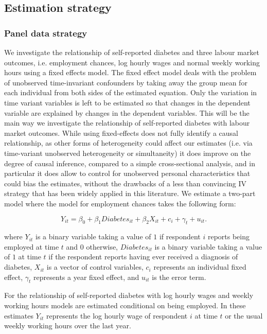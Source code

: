 \subsection{\label{sec:Estimation_Strategy}Estimation strategy}


\subsubsection{Panel data strategy}

We investigate the relationship of self-reported diabetes and three
labour market outcomes, i.e. employment chances, log hourly wages
and normal weekly working hours using a fixed effects model. The fixed
effect model deals with the problem of unobserved time-invariant confounders
by taking away the group mean for each individual from both sides
of the estimated equation. Only the variation in time variant variables
is left to be estimated so that changes in the dependent variable
are explained by changes in the dependent variables. This will be
the main way we investigate the relationship of self-reported diabetes
with labour market outcomes. While using fixed-effects does not fully
identify a causal relationship, as other forms of heterogeneity could
affect our estimates (i.e. via time-variant unobserved heterogeneity
or simultaneity) it does improve on the degree of causal inference,
compared to a simple cross-sectional analysis, and in particular it
does allow to control for unobserved personal characteristics that
could bias the estimates, without the drawbacks of a less than convincing
\ac{IV} strategy that has been widely applied in this literature.
We estimate a two-part model where the model for employment chances
takes the following form:

\noindent 
\begin{equation}
Y_{it}=\beta_{0}+\beta_{1}Diabetes_{it}+\beta_{2}X_{it}+c_{i}+\gamma_{t}+u_{it}.\label{eq:employed}
\end{equation}


where $Y_{it}$ is a binary variable taking a value of $1$ if respondent
$i$ reports being employed at time $t$ and $0$ otherwise, $Diabetes_{it}$
is a binary variable taking a value of $1$ at time $t$ if the respondent
reports having ever received a diagnosis of diabetes, $X_{it}$ is
a vector of control variables, $c_{i}$ represents an individual fixed
effect, $\gamma_{t}$ represents a year fixed effect, and $u_{it}$
is the error term.

For the relationship of self-reported diabetes with log hourly wages
and weekly working hours models are estimated conditional on being
employed. In these estimates $Y_{it}$ represents the log hourly wage
of respondent $i$ at time $t$ or the usual weekly working hours
over the last year.

